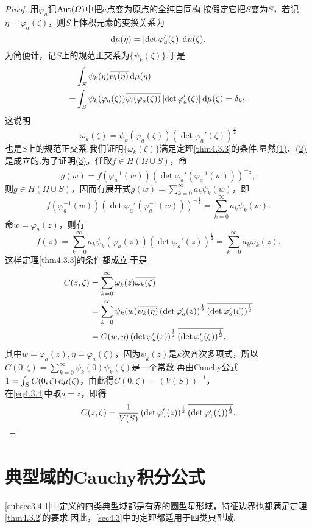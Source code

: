 \begin{proof}
	用$\varphi_a$记$\Aut(\Omega)$中把$a$点变为原点的全纯自同构.按假定它把$S$变为$S$，若记$\eta=\varphi_a(\zeta)$，则$S$上体积元素的变换关系为
	\[\dif\mu(\eta)=\left|\det\varphi_a'(\zeta)\right|\dif\mu(\zeta).\]
	为简便计，记$S$上的规范正交系为$\{\psi_k(\zeta)\}$.于是
	\begin{align*}
		&\int_S \psi_k(\eta)\bar{\psi_l(\eta)}\dif\mu(\eta)\\
		=&\int_S \psi_k(\varphi_a(\zeta))\bar{\psi_l(\varphi_a(\zeta))}\left|\det\varphi_a'(\zeta)\right|\dif\mu(\zeta)=\delta_{kl}.
	\end{align*}
这说明
\[\omega_k(\zeta)=\psi_k(\varphi_a(\zeta))\left(\det\varphi_a'(\zeta)\right)^{\frac12}\]
也是$S$上的规范正交系.我们证明$\{\omega_k(\zeta)\}$满足定理\ref{thm4.3.3}的条件.显然\hyperlink{4.3.3}{(1)}、\hyperlink{4.3.3}{(2)}是成立的.为了证明\hyperlink{4.3.3}{(3)}，任取$f\in H(\Omega\cup S)$，命
\[g(w)=f(\varphi_a^{-1}(w))\left(\det\varphi_a'(\varphi_a^{-1}(w))\right)^{-\frac12},\]
则$g\in H(\Omega\cup S)$，因而有展开式$g(w)=\sum\limits_{k=0}^\infty a_k\psi_k(w)$，即
\[f(\varphi_a^{-1}(w))\left(\det\varphi_a'(\varphi_a^{-1}(w))\right)^{-\frac12}=\sum\limits_{k=0}^\infty a_k\psi_k(w).\]
命$w=\varphi_a(z)$，则有
\[f(z)=\sum_{k=0}^{\infty}a_k\psi_k(\varphi_a(z))\left(\det\varphi_a'(z)\right)^{\frac12}=\sum_{k=0}^{\infty}a_k\omega_k(z).\]
这样定理\ref{thm4.3.3}的条件都成立.于是
\begin{align}\label{eq4.3.4}
	C(z,\zeta)
	&=\sum_{k=0}^{\infty}\omega_k(z)\bar{\omega_k(\zeta)}\notag\\
	&=\sum_{k=0}^{\infty}\psi_k(w)\bar{\psi_k(\eta)}\left(\det\varphi_a'(z)\right)^{\frac12}\bar{\left(\det\varphi_a'(\zeta)\right)^{\frac12}}\notag\\
	&=C(w,\eta)\left(\det\varphi_a'(z)\right)^{\frac12}\bar{\left(\det\varphi_a'(\zeta)\right)^{\frac12}},
\end{align}
其中$w=\varphi_a(z),\eta=\varphi_a(\zeta)$，因为$\psi_k(z)$是$k$次齐次多项式，所以$C(0,\zeta)=\sum\limits_{k=0}^\infty \psi_k(0)\psi_k(\zeta)$是一个常数.再由Cauchy公式$1=\int_S C(0,\zeta)\dif\mu(\zeta)$，由此得$C(0,\zeta)=\left(V(S)\right)^{-1}$，\\
在\eqref{eq4.3.4}中取$a=z$，即得
\[C(z,\zeta)=\frac1{V(S)}\left(\det\varphi_z'(z)\right)^{\frac12}\bar{\left(\det\varphi_z'(\zeta)\right)^{\frac12}}.\qedhere\]
\end{proof}
\section{典型域的Cauchy积分公式\label{sec4.4}}
\ref{subsec3.4.1}中定义的四类典型域都是有界的圆型星形域，特征边界也都满足定理\ref{thm4.3.2}的要求.因此，\ref{sec4.3}中的定理都适用于四类典型域.
